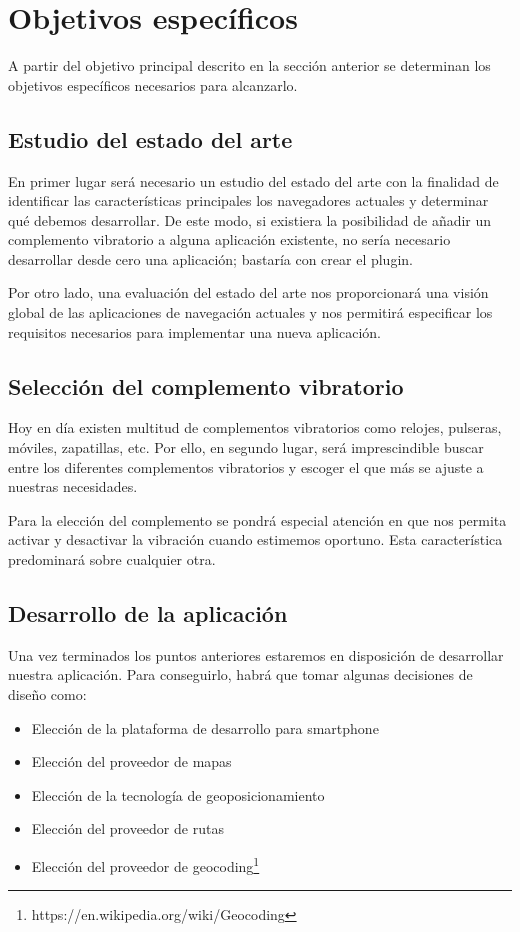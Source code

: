 \section{Objetivos específicos}

A partir del objetivo principal descrito en la sección anterior se determinan los objetivos
específicos necesarios para alcanzarlo.

\subsection{Estudio del estado del arte}

En primer lugar será necesario un estudio del estado del arte con la finalidad de identificar las
características principales los navegadores actuales y determinar qué debemos desarrollar. De este
modo, si existiera la posibilidad de añadir un complemento vibratorio a alguna aplicación existente,
no sería necesario desarrollar desde cero una aplicación; bastaría con crear el plugin.

Por otro lado, una evaluación del estado del arte nos proporcionará una visión global de las
aplicaciones de navegación actuales y nos permitirá especificar los requisitos necesarios para
implementar una nueva aplicación.

\subsection{Selección del complemento vibratorio}

Hoy en día existen multitud de complementos vibratorios como relojes, pulseras, móviles, zapatillas,
etc. Por ello, en segundo lugar, será imprescindible buscar entre los diferentes complementos
vibratorios y escoger el que más se ajuste a nuestras necesidades.

Para la elección del complemento se pondrá especial atención en que nos permita activar y desactivar
la vibración cuando estimemos oportuno. Esta característica predominará sobre cualquier otra.

\subsection{Desarrollo de la aplicación}

Una vez terminados los puntos anteriores estaremos en disposición de desarrollar nuestra aplicación.
Para conseguirlo, habrá que tomar algunas decisiones de diseño como:

\begin{itemize}
  \item Elección de la plataforma de desarrollo para smartphone
  \item Elección del proveedor de mapas
  \item Elección de la tecnología de geoposicionamiento
  \item Elección del proveedor de rutas
  \item Elección del proveedor de geocoding\footnote{https://en.wikipedia.org/wiki/Geocoding}
\end{itemize}

